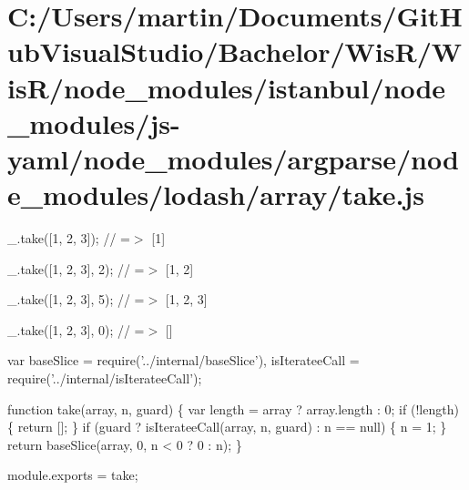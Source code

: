 \hypertarget{_c_1_2_users_2martin_2_documents_2_git_hub_visual_studio_2_bachelor_2_wis_r_2_wis_r_2node_module5dea190d20b3164d0dc263a567f64e5b}{}\section{C\+:/\+Users/martin/\+Documents/\+Git\+Hub\+Visual\+Studio/\+Bachelor/\+Wis\+R/\+Wis\+R/node\+\_\+modules/istanbul/node\+\_\+modules/js-\/yaml/node\+\_\+modules/argparse/node\+\_\+modules/lodash/array/take.\+js}
\+\_\+.\+take(\mbox{[}1, 2, 3\mbox{]}); // =$>$ \mbox{[}1\mbox{]}

\+\_\+.\+take(\mbox{[}1, 2, 3\mbox{]}, 2); // =$>$ \mbox{[}1, 2\mbox{]}

\+\_\+.\+take(\mbox{[}1, 2, 3\mbox{]}, 5); // =$>$ \mbox{[}1, 2, 3\mbox{]}

\+\_\+.\+take(\mbox{[}1, 2, 3\mbox{]}, 0); // =$>$ \mbox{[}\mbox{]}


\begin{DoxyCodeInclude}
var baseSlice = require(\textcolor{stringliteral}{'../internal/baseSlice'}),
    isIterateeCall = require(\textcolor{stringliteral}{'../internal/isIterateeCall'});

\textcolor{keyword}{function} take(array, n, guard) \{
  var length = array ? array.length : 0;
  \textcolor{keywordflow}{if} (!length) \{
    \textcolor{keywordflow}{return} [];
  \}
  \textcolor{keywordflow}{if} (guard ? isIterateeCall(array, n, guard) : n == null) \{
    n = 1;
  \}
  \textcolor{keywordflow}{return} baseSlice(array, 0, n < 0 ? 0 : n);
\}

module.exports = take;
\end{DoxyCodeInclude}
 